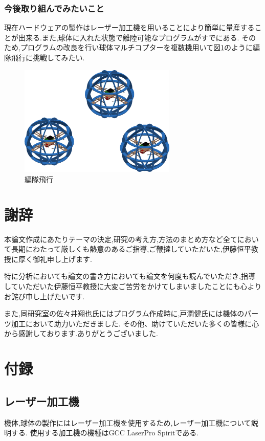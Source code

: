 \documentclass[12pt,oneside]{sotsuken_paper}
\begin{document}
\subsection{今後取り組んでみたいこと}

現在ハードウェアの製作はレーザー加工機を用いることにより簡単に量産することが出来る.また,球体に入れた状態で離陸可能なプログラムがすでにある.
そのため,プログラムの改良を行い球体マルチコプターを複数機用いて図\ref{fig:hen}のように編隊飛行に挑戦してみたい.

\begin{figure}[htbp]
	\begin{center}
		\includegraphics[width=75mm]{image/hen.png}
		\caption{編隊飛行}
		\label{fig:hen}
	\end{center}
\end{figure}


\chapter*{謝辞}
本論文作成にあたりテーマの決定,研究の考え方,方法のまとめ方など全てにおいて長期にわたって厳しくも熱意のあるご指導,ご鞭撻していただいた,伊藤恒平教授に厚く御礼申し上げます.


特に分析においても論文の書き方においても論文を何度も読んでいただき,指導していただいた伊藤恒平教授に大変ご苦労をかけてしまいましたことにも心よりお詫び申し上げたいです.


また,同研究室の佐々井翔也氏にはプログラム作成時に,戸澗健氏には機体のパーツ加工において助力いただきました.
その他、助けていただいた多くの皆様に心から感謝しております.ありがとうございました.


\chapter*{付録}
\appendix
\renewcommand{\thesection}{A}
\renewcommand{\thesubsection}{A.\ \arabic{section}}

\section{レーザー加工機}
機体,球体の製作にはレーザー加工機を使用するため,レーザー加工機について説明する.
使用する加工機の機種はGCC LaserPro Spiritである.
\end{document}
